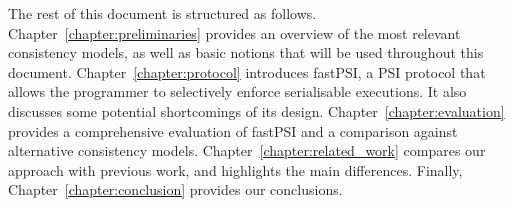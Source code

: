 The rest of this document is structured as follows. Chapter~\ref{chapter:preliminaries} provides an overview of the most relevant consistency models, as well as basic notions that will be used throughout this document. Chapter~\ref{chapter:protocol} introduces fastPSI, a PSI protocol that allows the programmer to selectively enforce serialisable executions. It also discusses some potential shortcomings of its design. Chapter~\ref{chapter:evaluation} provides a comprehensive evaluation of fastPSI and a comparison against alternative consistency models. Chapter~\ref{chapter:related_work} compares our approach with previous work, and highlights the main differences. Finally, Chapter~\ref{chapter:conclusion} provides our conclusions.
